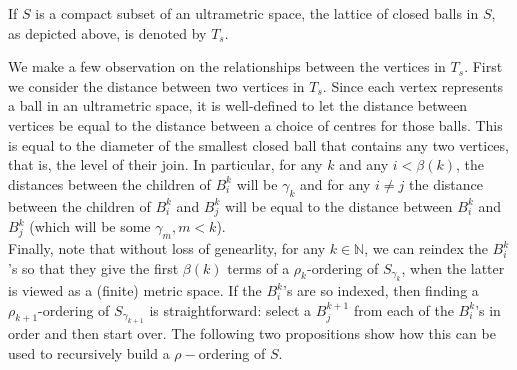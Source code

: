 \tikzset{font=\small,
level distance=1.75cm,
}

\begin{center}
\end{center}

\begin{notation*}
If $S$ is a compact subset of an ultrametric space, the lattice of closed balls in $S$, as depicted above, is denoted by $T_s$.\\
\end{notation*}

We make a few observation on the relationships between the vertices in $T_s$. First we consider the distance between two vertices in $T_s$. Since each vertex represents a ball in an ultrametric space, it is well-defined to let the distance between vertices be equal to the distance between a choice of centres for those balls. This is equal to the diameter of the smallest closed ball that contains any two vertices, that is, the level of their join. In particular, for any $k$ and any $i < \beta(k)$, the distances between the children of $B^k_i$ will be $\gamma_k$ and for any $i \neq j$ the distance between the children of $B^k_i$ and $B^k_j$ will be equal to the distance between  $B^k_i$ and $B^k_j$ (which will be some $\gamma_{m}, m <k$).\\

Finally, note that without loss of genearlity, for any $k \in \mathbb{N}$, we can reindex the $B^k_i$'s so that they give the first $\beta(k)$ terms of a $\rho_k$-ordering of $S_{\gamma_k}$, when the latter is viewed as a (finite) metric space. If the $B^k_i$'s are so indexed, then finding a $\rho_{k+1}$-ordering of $S_{\gamma_{k+1}}$ is straightforward: select a $B^{k+1}_j$ from each of the $B^k_i$'s in order and then start over.  The following two propositions show how this can be used to recursively build a $\rho-$ordering of $S$.

